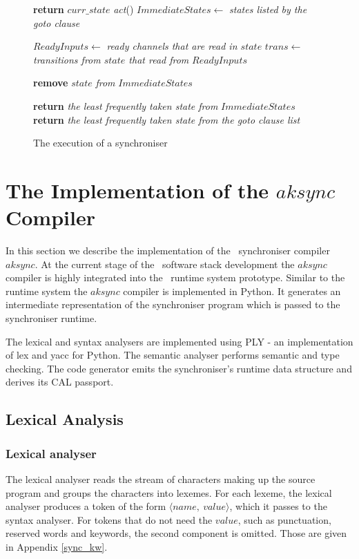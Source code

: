 \begin{figure}
{\begin{minipage}{\dimexpr\linewidth-2\fboxsep-2\fboxrule\relax}
\begin{algorithmic}[1]
    \State \textbf{return} $curr\_state$
  \EndIf
  \State \emph{act}()
  \State $ImmediateStates\gets$ \emph{states listed by the goto clause}
  \Statex

    \State $ReadyInputs\gets$ \emph{ready channels that are read in $state$}
    \State $trans\gets$ \emph{transitions from $state$ that read from} $ReadyInputs$

      \State \textbf{remove} $state$ \emph{from} $ImmediateStates$
    \EndIf
  \EndFor

    \State \textbf{return} \emph{the least frequently taken state from} $ImmediateStates$    
  \EndIf
  \State \textbf{return} \emph{the least frequently taken state from the goto clause list}
\EndFunction
\end{algorithmic}
\end{minipage}%
}
\caption{The execution of a synchroniser\label{fig:execod_alg}}
\end{figure}




\section{The Implementation of the $aksync$ Compiler}
In this section we describe the implementation of the \ak\ synchroniser compiler $aksync$. At the current stage of the \ak\ software stack development the $aksync$ compiler is highly integrated into the \ak\ runtime system prototype. Similar to the runtime system the $aksync$ compiler is implemented in Python. It generates an intermediate representation of the synchroniser program which is passed to the synchroniser runtime.

The lexical and syntax analysers are implemented using PLY \cite{ply} - an implementation of lex and yacc for Python. The semantic analyser performs semantic and type checking. The code generator emits the synchroniser's runtime data structure and derives its CAL passport.


\subsection{Lexical Analysis}
  \subsubsection{Lexical analyser}
The lexical analyser reads the stream of characters making up the source program and groups the characters into lexemes. For each lexeme, the lexical analyser produces a token of the form $\langle name, \: value \rangle$, which it passes to the syntax analyser. For tokens that do not need the $value$, such as punctuation, reserved words and keywords, the second component is omitted. Those are given in Appendix \ref{sync_kw}.

